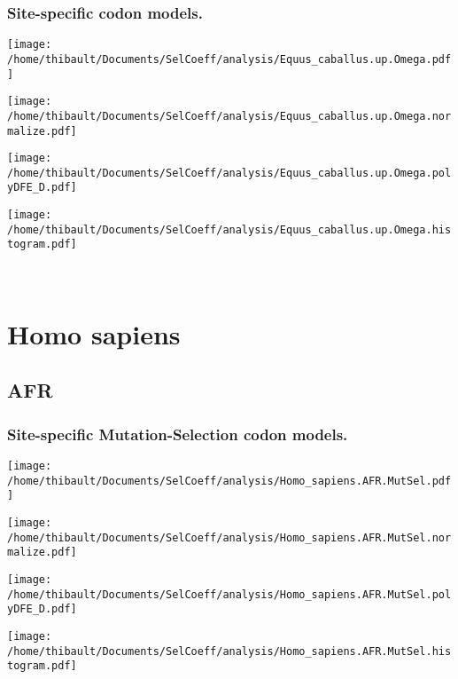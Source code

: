 \subsubsection*{Site-specific codon models.} 
\begin{minipage}{0.49\linewidth} 
\texttt{[image: /home/thibault/Documents/SelCoeff/analysis/Equus\_caballus.up.Omega.pdf]} 
\end{minipage}
\begin{minipage}{0.49\linewidth} 
\texttt{[image: /home/thibault/Documents/SelCoeff/analysis/Equus\_caballus.up.Omega.normalize.pdf]} 
\end{minipage}
\begin{minipage}{0.49\linewidth} 
\texttt{[image: /home/thibault/Documents/SelCoeff/analysis/Equus\_caballus.up.Omega.polyDFE\_D.pdf]} 
\end{minipage}
\begin{minipage}{0.49\linewidth} 
\texttt{[image: /home/thibault/Documents/SelCoeff/analysis/Equus\_caballus.up.Omega.histogram.pdf]} 
\end{minipage}
\\ 
\section{Homo sapiens} 
 
\subsection{AFR} 
 
\subsubsection*{Site-specific Mutation-Selection codon models.} 
\begin{minipage}{0.49\linewidth} 
\texttt{[image: /home/thibault/Documents/SelCoeff/analysis/Homo\_sapiens.AFR.MutSel.pdf]} 
\end{minipage}
\begin{minipage}{0.49\linewidth} 
\texttt{[image: /home/thibault/Documents/SelCoeff/analysis/Homo\_sapiens.AFR.MutSel.normalize.pdf]} 
\end{minipage}
\begin{minipage}{0.49\linewidth} 
\texttt{[image: /home/thibault/Documents/SelCoeff/analysis/Homo\_sapiens.AFR.MutSel.polyDFE\_D.pdf]} 
\end{minipage}
\begin{minipage}{0.49\linewidth} 
\texttt{[image: /home/thibault/Documents/SelCoeff/analysis/Homo\_sapiens.AFR.MutSel.histogram.pdf]} 
\end{minipage}
\\ 
